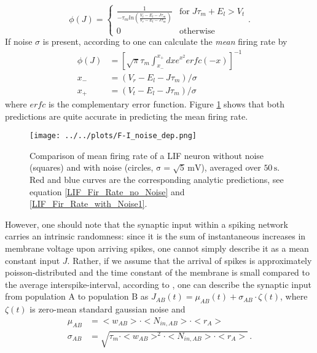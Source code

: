 \documentclass[10pt,a4paper]{article}
\begin{document}
\begin{equation}
\phi(J) = \begin{cases}\frac{1}{-\tau_m ln(\frac{V_t -E_l-J\tau_m}{V_r -E_l-J\tau_m})} & \mathrm{for}\; J\tau_m + E_l > V_t\\
0 & \mathrm{otherwise}
\end{cases}.
\label{LIF_Fir_Rate_no_Noise}
\end{equation}
If noise $\sigma$ is present, according to \cite{Roxin_Firing_Rate_Distribution} one can calculate the \emph{mean} firing rate by
\begin{align}
\phi(J) &= \left[ \sqrt{\pi}\tau_m \int_{x_-}^{x_+} dx e^{x^2} erfc(-x) \right]^{-1} \label{LIF_Fir_Rate_with_Noise1}\\
x_- &= (V_r-E_l-J\tau_m)/\sigma \label{LIF_Fir_Rate_with_Noise2}\\
x_+ &= (V_t-E_l-J\tau_m)/\sigma \label{LIF_Fir_Rate_with_Noise3}
\end{align}
where $erfc$ is the complementary error function. Figure \ref{F-I_noise_dep} shows that both predictions are quite accurate in predicting the mean firing rate. 
\begin{figure}
\begin{center}
\texttt{[image: ../../plots/F-I\_noise\_dep.png]}
\end{center}
\caption{Comparison of mean firing rate of a LIF neuron without noise (squares) and with noise (circles, $\mathrm{\sigma = \sqrt{5}\, mV}$), averaged over $\mathrm{50\, s}$. Red and blue curves are the corresponding analytic predictions, see equation \ref{LIF_Fir_Rate_no_Noise} and \ref{LIF_Fir_Rate_with_Noise1}.}
\label{F-I_noise_dep}
\end{figure}
However, one should note that the synaptic input within a spiking network carries an intrinsic randomness: since it is the sum of instantaneous increases in membrane voltage upon arriving spikes, one cannot simply describe it as a mean constant input $J$. Rather, if we assume that the arrival of spikes is approximately poisson-distributed and the time constant of the membrane is small compared to the average interspike-interval, according to \cite{Roxin_Firing_Rate_Distribution}, one can describe the synaptic input from population $\mathrm{A}$ to population $\mathrm{B}$ as $J_{AB}(t) = \mu_{AB} (t) + \sigma_{AB} \cdot \zeta(t)$, where $\zeta(t)$ is zero-mean standard gaussian noise and
\begin{align}
\mu_{AB} &= <w_{AB}> \cdot <N_{in,AB}> \cdot <r_A> \label{Noise_Approx_1}\\
\sigma_{AB} &= \sqrt{\tau_m \cdot <w_{AB}>^2 \cdot <N_{in,AB}> \cdot <r_A>} \label{Noise_Approx_1} \, .
\end{align}
\end{document}
